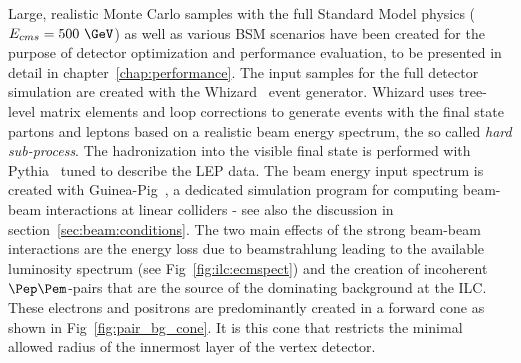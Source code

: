 Large, realistic Monte Carlo samples with the full Standard Model physics ($E_{cms}=500~\GeV$) as well as various
BSM scenarios have been created for the purpose of detector optimization and performance evaluation, to be presented in detail in
chapter~\ref{chap:performance}. The input samples for the full detector simulation
are created with the Whizard~\cite{Kilian:2007gr} event generator.
Whizard uses tree-level matrix elements and loop corrections to generate events with the final state partons and leptons
based on a realistic beam energy spectrum, the so called \emph{hard sub-process}. The hadronization into the visible final state
is performed with Pythia~\cite{Sjostrand:2006za} tuned to describe the LEP data.
The beam energy input spectrum is created with Guinea-Pig~\cite{Schulte:1998au}, a dedicated simulation program for computing
beam-beam interactions at linear colliders - see also the discussion in section~\ref{sec:beam:conditions}.
The two main effects of the strong beam-beam interactions are the energy loss due to
beamstrahlung leading to the available luminosity spectrum (see Fig~\ref{fig:ilc:ecmspect}) and the creation of
incoherent $\Pep\Pem$-pairs that are the source of the dominating background at the ILC.
These electrons and positrons are predominantly created in a forward cone as shown in Fig~\ref{fig:pair_bg_cone}.
It is this cone that restricts the minimal allowed radius of the innermost layer of the vertex detector.
%
